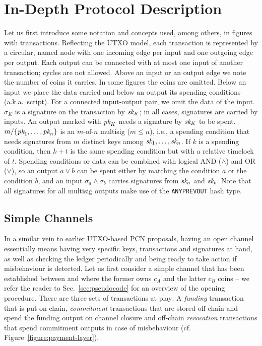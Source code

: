 \section{In-Depth Protocol Description}
\label{sec:description}
  Let us first introduce some notation and concepts used, among others, in
  figures with transactions.
  Reflecting the UTXO model, each transaction is represented by a circular,
  named node with one incoming edge per input and one outgoing edge per output.
  Each output can be connected with at most one input of another transaction;
  cycles are not allowed. Above an input or an output edge we note the number of
  coins it carries. In some figures the coins are omitted. Below an input we
  place the data carried and below an output its spending conditions (a.k.a.\
  script). For
  a connected input-output pair, we omit the data of the input.
  $\sigma_K$ is a signature on the transaction by $\textit{sk}_{K}$; in all cases, signatures
  are carried by inputs. An output marked
  with $\textit{pk}_{K}$ needs a signature by $\textit{sk}_{K}$ to be spent. $m/\{\textit{pk}_{1}, \dots,
  \textit{pk}_{n}\}$ is an $m$-of-$n$ multisig ($m \leq n$), i.e., a spending condition that needs signatures from
  $m$ distinct keys among $\textit{sk}_{1}, \dots, \textit{sk}_{n}$. If $k$ is a spending
  condition, then $k + t$ is the same spending condition but with a relative timelock
  of $t$. Spending conditions or data can be combined with logical AND
  ($\wedge$) and OR ($\vee$), so an output $a \vee b$ can be spent either by
  matching the condition $a$ or the condition $b$, and an input $\sigma_a \wedge
  \sigma_b$ carries signatures from $\textit{sk}_{a}$ and $\textit{sk}_{b}$.
  Note that all signatures for all multisig outputs make use of the
  \texttt{ANYPREVOUT} hash type.

\subsection{Simple Channels}
  In a similar vein to earlier UTXO-based PCN proposals, having an open channel essentially
  means having very specific keys, transactions and signatures at hand, as well
  as checking the ledger periodically and being ready to take action if
  misbehaviour is detected. Let us first consider a simple channel that has been
  established between \alice and \bob where the former owns $c_A$ and the latter
  $c_B$ coins -- we refer the reader to Sec.~\ref{sec:pseudocode} for an
  overview of the opening procedure. There are
  three sets of transactions at play: A \emph{funding}
  transaction that is put on-chain, \emph{commitment} transactions that are stored
  off-chain and
  spend the funding output on channel closure and off-chain \emph{revocation}
  transactions that spend commitment outputs in case of misbehaviour (cf.
  Figure~\ref{figure:payment-layer}).

